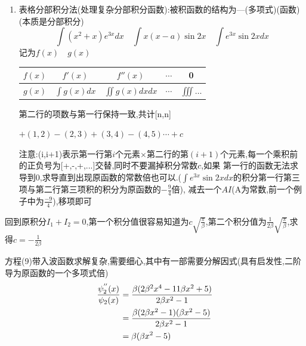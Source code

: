 \documentclass{article}
\begin{document}
\begin{formal}
\begin{enumerate}
\begin{proof}
                \end{proof}

            \item 表格分部积分法(处理复杂分部积分函数):被积函数的结构为---(多项式)(函数)\quad(本质是分部积分)
                $$ \int(x^{2}+x) e^{3x} dx \quad \int x(x-a)\sin{2x} \quad \int e^{3x}\sin{2x}dx $$
                记为$f(x) \quad g(x)$

              
                \begin{center}

                    \begin{tabular}{|c|c|c|c|c|}
                        
                        \hline
                        $f(x)$ & $f'(x)$        & $f''(x)$          & $\cdots$ & 0 \\
                        \hline
                        $g(x)$ & $\int g(x) dx$ & $\iint g(x) dxdx$ & $\cdots$ & $\iiint \dots$ \\
                        \hline
                        
                    \end{tabular}
                    
                \end{center}
                
                第二行的项数与第一行保持一致,共计[n,n]

                $+(1,2)-(2,3)+(3,4)-(4,5)\cdots + c$ \quad 
                
                注意:(i,i+1)表示第一行第$i$个元素$\times$第二行的第$(i+1)$个元素,每一个乘积前的正负号为[+,-,+,...]交替,同时不要漏掉积分常数$c$,如果
                第一行的函数无法求导到0,求导直到出现原函数的常数倍也可以.($\int e^{3x}\sin{2x}dx $的积分第一行第三项与第二行第三项积的积分为原函数的$-\frac{9}{4}$倍),
                减去一个$A I$(A为常数,前一个例子中为$\frac{-9}{4}$),移项即可
            \end{enumerate}   
        \end{formal}

        回到原积分$I_{1}+I_{2}=0$,第一个积分值很容易知道为$c \sqrt{\frac{\pi}{\beta}}$,第二个积分值为$\frac{1}{2\beta} \sqrt{\frac{\pi}{\beta}}$,求得$ c = -\frac{1}{2\beta}$

        方程(9)带入波函数求解复杂,需要细心,其中有一部需要分解因式(具有启发性,二阶导为原函数的一个多项式倍)
        \begin{align*}
            \frac{\psi_{2}^{''} (x)}{\psi_{2} (x)} & = \frac{\beta (2\beta^{2} x^{4} -11\beta x^{2} +5)}{2\beta x^{2}-1} \\
                                        & = \frac{\beta (2\beta x^{2} - 1) (\beta x^{2}-5)}{2\beta x^{2}-1}   \\
                                        & = \beta(\beta x^{2}-5) 
        \end{align*}
        
\end{document}
